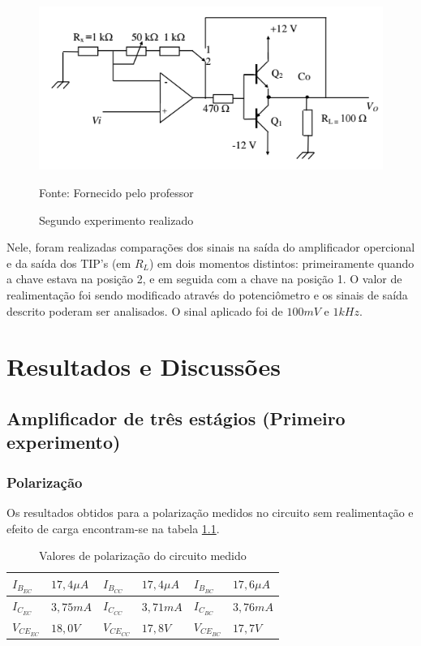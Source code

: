 \documentclass[openright]{normas-utf-tex} %
\begin{document}
\begin{figure}[H]
\centering
\includegraphics[width=0.8\linewidth]{img/exp2.png}
\caption{Segundo experimento realizado}
Fonte: Fornecido pelo professor
\label{fig:exp2}
\end{figure}

Nele, foram realizadas comparações dos sinais na saída do amplificador opercional e da saída dos TIP's (em $R_L$) em dois momentos distintos: primeiramente quando a chave estava na posição 2, e em seguida com a chave na posição 1. O valor de realimentação foi sendo modificado através do potenciômetro e os sinais de saída descrito poderam ser analisados. O sinal aplicado foi de $100mV$ e $1kHz$.

\chapter{Resultados e Discussões} 
\label{sec:anal_dados}

\section{Amplificador de três estágios (Primeiro experimento)}



\subsection{Polarização}

Os resultados obtidos para a polarização medidos no circuito sem realimentação e efeito de carga encontram-se na tabela \ref{tab:pol_pratica}.

\begin{table}[H]
\centering
\caption{Valores de polarização do circuito medido}
\label{tab:pol_pratica}
\begin{tabular}{|ll|ll|ll|}
\hline
$I_{B_{EC}}$  & $17,4\mu A$  & $I_{B_{CC}}$  & $17,4\mu A$  & $I_{B_{BC}}$  & $17,6\mu A$  \\ \hline
$I_{C_{EC}}$  & $3,75 mA$ & $I_{C_{CC}}$  & $3,71 mA$ & $I_{C_{BC}}$  & $3,76 mA$ \\ \hline
$V_{CE_{EC}}$ & $18,0V$      & $V_{CE_{CC}}$ & $17,8V$      & $V_{CE_{BC}}$ & $17,7V$      \\ \hline
\end{tabular}
\end{table}
\end{document}
